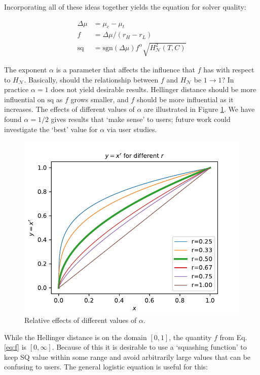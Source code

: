 Incorporating all of these ideas together yields the equation for solver quality:

\begin{align}
    \Delta \mu &= \mu_c-\mu_t\\
    f &= \Delta \mu/(r_H-r_L) \label{eq:f}\\
    \text{sq} &= \text{sgn}(\Delta \mu)f^{\alpha}\sqrt{H_{\mathcal{N}}^{2}(T,C)} \label{eq:sq}
\end{align}

The exponent $\alpha$ is a parameter that affects the influence that $f$ has with respect to $H_{\mathcal{N}}$. Basically, should the relationship between $f$ and $H_{\mathcal{N}}$ be $1\to1$? In practice $\alpha=1$ does not yield desirable results. Hellinger distance should be more influential on $\text{sq}$ as $f$ grows smaller, and $f$ should be more influential as it increases. The effects of different values of $\alpha$ are illustrated in Figure \ref{fig:alphas}. We have found $\alpha=1/2$ gives results that `make sense' to users; future work could investigate the `best' value for $\alpha$ via user studies.

\begin{figure}[tbp]
    \centering
    \includegraphics[width=0.9\linewidth]{Figures/power_comparison}
    \caption{Relative effects of different values of $\alpha$.}
    \label{fig:alphas}
\end{figure}

While the Hellinger distance is on the domain $[0,1]$, the quantity $f$ from Eq. \ref{eq:f} is $[0,\infty]$. Because of this it is desirable to use a `squashing function' to keep SQ value within some range and avoid arbitrarily large values that can be confusing to users. The general logistic equation is useful for this:

